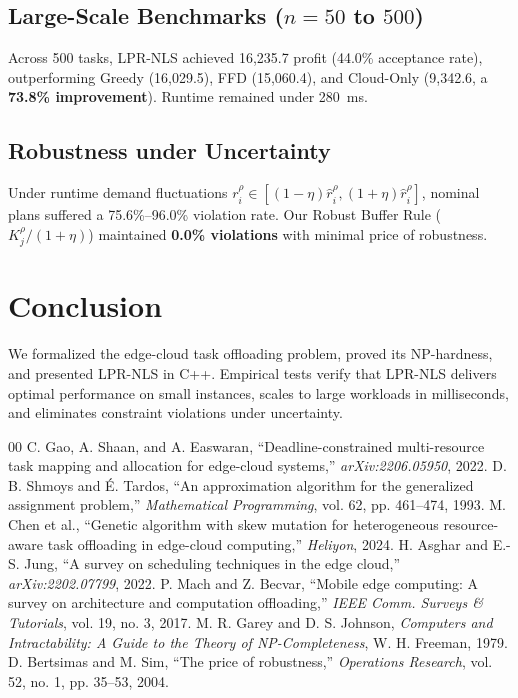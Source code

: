 \documentclass[conference,10pt]{IEEEtran}
\begin{document}
\subsection{Large-Scale Benchmarks ($n=50$ to $500$)}
Across 500 tasks, LPR-NLS achieved 16,235.7 profit (44.0\% acceptance rate), outperforming Greedy (16,029.5), FFD (15,060.4), and Cloud-Only (9,342.6, a \textbf{73.8\% improvement}). Runtime remained under 280~ms.

\subsection{Robustness under Uncertainty}
Under runtime demand fluctuations $r_i^\rho \in [(1-\eta)\hat{r}_i^\rho, (1+\eta)\hat{r}_i^\rho]$, nominal plans suffered a 75.6\%--96.0\% violation rate. Our Robust Buffer Rule ($K_j^\rho / (1+\eta)$) maintained \textbf{0.0\% violations} with minimal price of robustness.

\section{Conclusion}
We formalized the edge-cloud task offloading problem, proved its NP-hardness, and presented LPR-NLS in C++. Empirical tests verify that LPR-NLS delivers optimal performance on small instances, scales to large workloads in milliseconds, and eliminates constraint violations under uncertainty.

\begin{thebibliography}{00}
 C. Gao, A. Shaan, and A. Easwaran, ``Deadline-constrained multi-resource task mapping and allocation for edge-cloud systems,'' \textit{arXiv:2206.05950}, 2022.
 D. B. Shmoys and \'E. Tardos, ``An approximation algorithm for the generalized assignment problem,'' \textit{Mathematical Programming}, vol. 62, pp. 461--474, 1993.
 M. Chen et al., ``Genetic algorithm with skew mutation for heterogeneous resource-aware task offloading in edge-cloud computing,'' \textit{Heliyon}, 2024.
 H. Asghar and E.-S. Jung, ``A survey on scheduling techniques in the edge cloud,'' \textit{arXiv:2202.07799}, 2022.
 P. Mach and Z. Becvar, ``Mobile edge computing: A survey on architecture and computation offloading,'' \textit{IEEE Comm. Surveys \& Tutorials}, vol. 19, no. 3, 2017.
 M. R. Garey and D. S. Johnson, \textit{Computers and Intractability: A Guide to the Theory of NP-Completeness}, W. H. Freeman, 1979.
 D. Bertsimas and M. Sim, ``The price of robustness,'' \textit{Operations Research}, vol. 52, no. 1, pp. 35--53, 2004.
\end{thebibliography}
\end{document}
